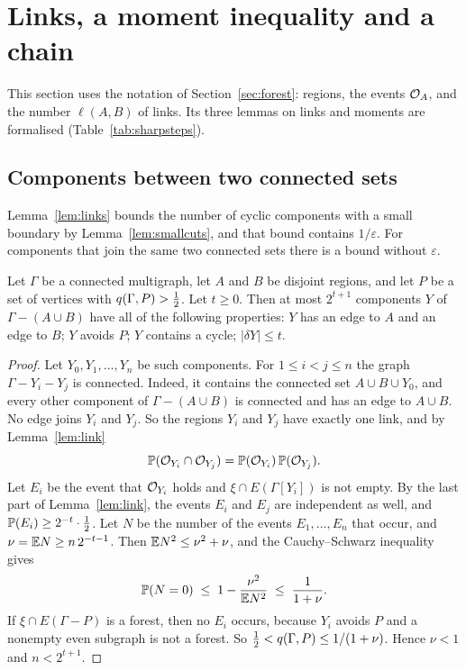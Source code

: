 \section{Links, a moment inequality and a chain}\label{sec:chain}

This section uses the notation of Section~\ref{sec:forest}: regions, the events $\mathcal{O}_A$, and the
number $\ell(A,B)$ of links. Its three lemmas on links and moments are formalised
(Table~\ref{tab:sharpsteps}).

\subsection{Components between two connected sets}

Lemma~\ref{lem:links} bounds the number of cyclic components with a small boundary by
Lemma~\ref{lem:smallcuts}, and that bound contains $1/\varepsilon$. For components that join the
same two connected sets there is a bound without $\varepsilon$.

\begin{lemma}\label{lem:parallel}
Let $\Gamma$ be a connected multigraph, let $A$ and $B$ be disjoint regions, and let $P$ be a set of
vertices with $q(\Gamma,P)>\tfrac12$. Let $t\ge0$. Then at most $2^{t+1}$ components $Y$ of
$\Gamma-(A\cup B)$ have all of the following properties: $Y$ has an edge to $A$ and an edge to $B$;
$Y$ avoids $P$; $Y$ contains a cycle; $|\delta Y|\le t$.
\end{lemma}

\begin{proof}
Let $Y_0,Y_1,\dots,Y_n$ be such components. For $1\le i<j\le n$ the graph $\Gamma-Y_i-Y_j$ is
connected. Indeed, it contains the connected set $A\cup B\cup Y_0$, and every other component of
$\Gamma-(A\cup B)$ is connected and has an edge to $A\cup B$. No edge joins $Y_i$ and $Y_j$. So the
regions $Y_i$ and $Y_j$ have exactly one link, and by Lemma~\ref{lem:link}
\[
  \mathbb{P}(\mathcal{O}_{Y_i}\cap\mathcal{O}_{Y_j})=\mathbb{P}(\mathcal{O}_{Y_i})\,\mathbb{P}(\mathcal{O}_{Y_j}).
\]
Let $E_i$ be the event that $\mathcal{O}_{Y_i}$ holds and $\xi\cap E(\Gamma[Y_i])$ is not empty. By the last
part of Lemma~\ref{lem:link}, the events $E_i$ and $E_j$ are independent as well, and
$\mathbb{P}(E_i)\ge2^{-t}\cdot\tfrac12$. Let $N$ be the number of the events $E_1,\dots,E_n$ that occur, and
$\nu=\mathbb{E} N\ge n\,2^{-t-1}$. Then $\mathbb{E} N^{2}\le\nu^{2}+\nu$, and the Cauchy--Schwarz inequality gives
\[
  \mathbb{P}(N=0)\;\le\;1-\frac{\nu^{2}}{\mathbb{E} N^{2}}\;\le\;\frac1{1+\nu}.
\]
If $\xi\cap E(\Gamma-P)$ is a forest, then no $E_i$ occurs, because $Y_i$ avoids $P$ and a nonempty
even subgraph is not a forest. So $\tfrac12<q(\Gamma,P)\le1/(1+\nu)$. Hence $\nu<1$ and $n<2^{t+1}$.
\end{proof}

